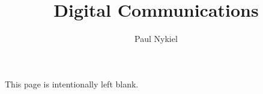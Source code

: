 \documentclass[10pt]{report}
\title{Digital Communications}
\author{Paul Nykiel}
\begin{document}
    \maketitle
    \pagebreak
    This page is intentionally left blank.
    \pagebreak
    \tableofcontents
    \pagebreak
    
    
    
    
    
    
    
    

    \appendix
    
\end{document}

